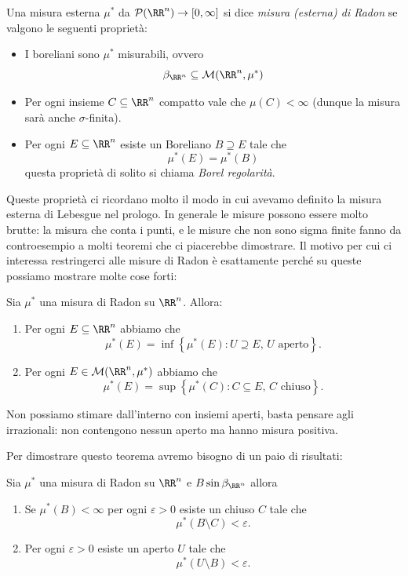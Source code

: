 \documentclass[11pt]{scrartcl}
\newcommand{\parti}[1]{\mathcal{P}\!\left(#1\right)}
\begin{document}
	\begin{definition}
		Una misura esterna $\mu^*$ da $\parti{\RR^n}\to [0,\infty]$ si dice \textit{misura (esterna) di Radon} se valgono le seguenti proprietà:
		\begin{itemize}
			\item I boreliani sono $\mu^*$ misurabili, ovvero
			$$\beta_{\RR^n}\subseteq \mathcal{M}(\RR^n,\mu^*)$$
			\item Per ogni insieme $C\subseteq \RR^n$ compatto vale che $\mu(C)<\infty$ (dunque la misura sarà anche $\sigma$-finita).
			\item Per ogni $E\subseteq\RR^n$ esiste un Boreliano $B\supseteq E$ tale che
			$$\mu^*(E)=\mu^*(B)$$
			questa proprietà di solito si chiama \textit{Borel regolarità}. 
		\end{itemize}
	\end{definition}
	Queste proprietà ci ricordano molto il modo in cui avevamo definito la misura esterna di Lebesgue nel prologo. In generale le misure possono essere molto brutte: la misura che conta i punti, e le misure che non sono sigma finite fanno da controesempio a molti teoremi che ci piacerebbe dimostrare. Il motivo per cui ci interessa restringerci alle misure di Radon è esattamente perché su queste possiamo mostrare molte cose forti:
	\begin{theorem*}[Di approssimabilità]
		Sia $\mu^*$ una misura di Radon su $\RR^n$. Allora:
		\begin{enumerate}
			\item Per ogni $E\subseteq \RR^n$ abbiamo che 
			$$\mu^*(E)=\inf\left\{\mu^*(E):U\supseteq E,\,U\text{ aperto}\right\}.$$
			\item Per ogni $E\in \mathcal{M}(\RR^n,\mu^*)$ abbiamo che
			$$\mu^*(E)=\sup\left\{\mu^*(C):C\subseteq E,\,C\text{ chiuso}\right\}.$$
		\end{enumerate}
	\end{theorem*}
	\begin{remark}
		Non possiamo stimare dall'interno con insiemi aperti, basta pensare agli irrazionali: non contengono nessun aperto ma hanno misura positiva.
	\end{remark}
	Per dimostrare questo teorema avremo bisogno di un paio di risultati:
	\begin{lemma}
		Sia $\mu^*$ una misura di Radon su $\RR^n$ e $B\sin \beta_{\RR^n}$ allora
		\begin{enumerate}
			\item Se $\mu^*(B)<\infty$ per ogni $\varepsilon>0$ esiste un chiuso $C$ tale che 
			$$\mu^*(B\setminus C)<\varepsilon.$$
			\item Per ogni $\varepsilon>0$ esiste un aperto $U$ tale che 
			$$\mu^*(U\setminus B)<\varepsilon.$$
		\end{enumerate}
	\end{lemma}
\end{document}

